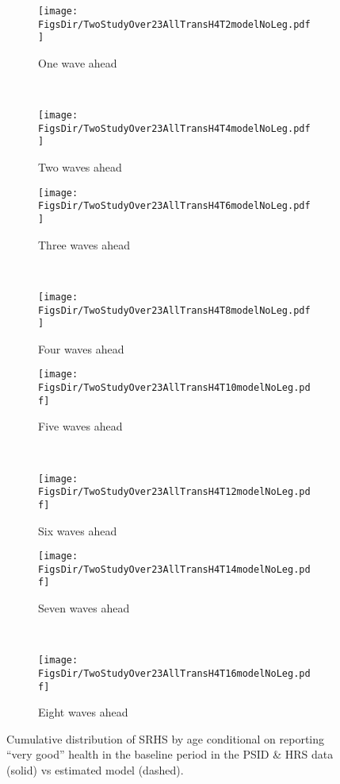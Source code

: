 \documentclass[12pt,pdftex,letterpaper]{article}
\newcommand{\RootDir}{..}
\newcommand{\FigsDir}{\RootDir/Figures}
\begin{document}
\begin{figure}
	\centering
	\begin{subfigure}[b]{0.45\textwidth}
		\texttt{[image: \\FigsDir/TwoStudyOver23AllTransH4T2modelNoLeg.pdf]}
		\caption{One wave ahead}\label{fig:Model1AheadVeryGood}
	\end{subfigure}
	~
	\begin{subfigure}[b]{0.45\textwidth}
		\texttt{[image: \\FigsDir/TwoStudyOver23AllTransH4T4modelNoLeg.pdf]}
		\caption{Two waves ahead}\label{fig:Model2AheadVeryGood}
	\end{subfigure}
	
	\begin{subfigure}[b]{0.45\textwidth}
		\texttt{[image: \\FigsDir/TwoStudyOver23AllTransH4T6modelNoLeg.pdf]}
		\caption{Three waves ahead}\label{fig:Model3AheadVeryGood}
	\end{subfigure}
	~
	\begin{subfigure}[b]{0.45\textwidth}
		\texttt{[image: \\FigsDir/TwoStudyOver23AllTransH4T8modelNoLeg.pdf]}
		\caption{Four waves ahead}\label{fig:Model4AheadVeryGood}
	\end{subfigure}
	
	\begin{subfigure}[b]{0.45\textwidth}
		\texttt{[image: \\FigsDir/TwoStudyOver23AllTransH4T10modelNoLeg.pdf]}
		\caption{Five waves ahead}\label{fig:Model5AheadVeryGood}
	\end{subfigure}
	~
	\begin{subfigure}[b]{0.45\textwidth}
		\texttt{[image: \\FigsDir/TwoStudyOver23AllTransH4T12modelNoLeg.pdf]}
		\caption{Six waves ahead}\label{fig:Model6AheadVeryGood}
	\end{subfigure}
	
	\begin{subfigure}[b]{0.45\textwidth}
		\texttt{[image: \\FigsDir/TwoStudyOver23AllTransH4T14modelNoLeg.pdf]}
		\caption{Seven waves ahead}\label{fig:Model7AheadVeryGood}
	\end{subfigure}
	~
	\begin{subfigure}[b]{0.45\textwidth}
		\texttt{[image: \\FigsDir/TwoStudyOver23AllTransH4T16modelNoLeg.pdf]}
		\caption{Eight waves ahead}\label{fig:Model8AheadVeryGood}
	\end{subfigure}
	\caption{Cumulative distribution of SRHS by age conditional on reporting ``very good'' health in the baseline period in the PSID \& HRS data (solid) vs estimated model (dashed).}\label{fig:ModelTransVGa}
\end{figure}
\end{document}
